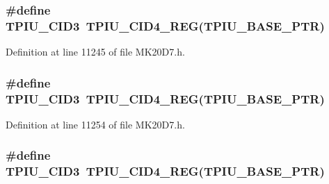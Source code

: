 \subsubsection[{\texorpdfstring{T\+P\+I\+U\+\_\+\+C\+I\+D3}{TPIU_CID3}}]{\setlength{\rightskip}{0pt plus 5cm}\#define T\+P\+I\+U\+\_\+\+C\+I\+D3~{\bf T\+P\+I\+U\+\_\+\+C\+I\+D4\+\_\+\+R\+EG}({\bf T\+P\+I\+U\+\_\+\+B\+A\+S\+E\+\_\+\+P\+TR})}\hypertarget{group___t_p_i_u___register___accessor___macros_ga73504328272607fbb53054442b6d4bb8}{}\label{group___t_p_i_u___register___accessor___macros_ga73504328272607fbb53054442b6d4bb8}


Definition at line 11245 of file M\+K20\+D7.\+h.

\subsubsection[{\texorpdfstring{T\+P\+I\+U\+\_\+\+C\+I\+D3}{TPIU_CID3}}]{\setlength{\rightskip}{0pt plus 5cm}\#define T\+P\+I\+U\+\_\+\+C\+I\+D3~{\bf T\+P\+I\+U\+\_\+\+C\+I\+D4\+\_\+\+R\+EG}({\bf T\+P\+I\+U\+\_\+\+B\+A\+S\+E\+\_\+\+P\+TR})}\hypertarget{group___t_p_i_u___register___accessor___macros_ga73504328272607fbb53054442b6d4bb8}{}\label{group___t_p_i_u___register___accessor___macros_ga73504328272607fbb53054442b6d4bb8}


Definition at line 11254 of file M\+K20\+D7.\+h.

\subsubsection[{\texorpdfstring{T\+P\+I\+U\+\_\+\+C\+I\+D3}{TPIU_CID3}}]{\setlength{\rightskip}{0pt plus 5cm}\#define T\+P\+I\+U\+\_\+\+C\+I\+D3~{\bf T\+P\+I\+U\+\_\+\+C\+I\+D4\+\_\+\+R\+EG}({\bf T\+P\+I\+U\+\_\+\+B\+A\+S\+E\+\_\+\+P\+TR})}\hypertarget{group___t_p_i_u___register___accessor___macros_ga73504328272607fbb53054442b6d4bb8}{}\label{group___t_p_i_u___register___accessor___macros_ga73504328272607fbb53054442b6d4bb8}


